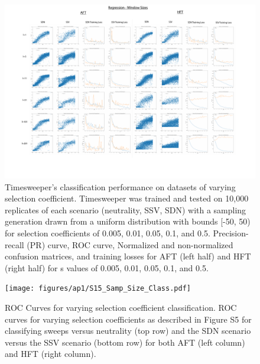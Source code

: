 \begin{figure}
    \centering
    \includegraphics[width=\textwidth]{figures/ap1/S14_Win_Sizes_Reg.pdf}
    \caption[Timesweeper’s classification performance on datasets of varying selection coefficient.]{Timesweeper’s classification performance on datasets of varying selection coefficient. Timesweeper was trained and tested on 10,000 replicates of each scenario (neutrality, SSV, SDN) with a sampling generation drawn from a uniform distribution with bounds [-50, 50) for selection coefficients of 0.005, 0.01, 0.05, 0.1, and 0.5. Precision-recall (PR) curve, ROC curve, Normalized and non-normalized confusion matrices, and training losses for AFT (left half) and HFT (right half) for s values of 0.005, 0.01, 0.05, 0.1, and 0.5.}
    \label{fig:S14_Win_Sizes_Reg}
\end{figure}

\begin{figure}
    \centering
    \texttt{[image: figures/ap1/S15\_Samp\_Size\_Class.pdf]}
    \caption[ROC Curves for varying selection coefficient classification.]{ROC Curves for varying selection coefficient classification. ROC curves for varying selection coefficients as described in Figure S5 for classifying sweeps versus neutrality (top row) and the SDN scenario versus the SSV scenario (bottom row) for both AFT (left column) and HFT (right column).}
    \label{fig:S15_Samp_Size_Class}
\end{figure}

